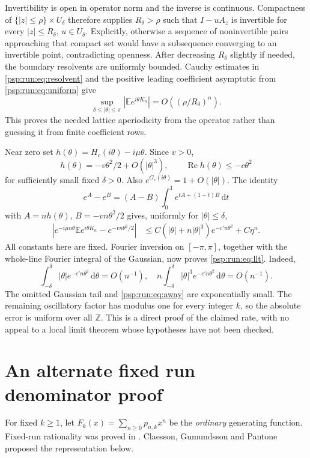\documentclass[11pt,letterpaper]{article}
\numberwithin{equation}{section}
\theoremstyle{remark}\newtheorem{remark}[theorem]{Remark}
\newcommand{\dd}{\,\mathrm d}
\newcommand{\EE}{\mathbb E}
\begin{document}
Invertibility is open in operator norm and the inverse is continuous.
Compactness of $\{|z|\leq\rho\}\times U_\delta$ therefore supplies
$R_\delta>\rho$ such that $I-uA_z$ is invertible for every
$|z|\leq R_\delta$, $u\in U_\delta$. Explicitly, otherwise a sequence
of noninvertible pairs approaching that compact set would have a
subsequence converging to an invertible point, contradicting openness.
After decreasing $R_\delta$ slightly if needed, the boundary resolvents
are uniformly bounded. Cauchy estimates in \eqref{psp:run:eq:resolvent} and the
positive leading coefficient asymptotic from \eqref{psp:run:eq:uniform} give
\begin{equation}\label{psp:run:eq:away}
 \sup_{\delta\leq|\theta|\leq\pi}
 |\EE e^{i\theta K_n}|=O((\rho/R_\delta)^n).
\end{equation}
This proves the needed lattice aperiodicity from the operator rather
than guessing it from finite coefficient rows.

Near zero set $h(\theta)=H_c(i\theta)-i\mu\theta$. Since $v>0$,
\[
 h(\theta)=-v\theta^2/2+O(|\theta|^3),\qquad
 \operatorname{Re}h(\theta)\leq-c\theta^2
\]
for sufficiently small fixed $\delta>0$. Also
$e^{G_c(i\theta)}=1+O(|\theta|)$. The identity
\[
 e^A-e^B=(A-B)\int_0^1e^{tA+(1-t)B}\dd t
\]
with $A=nh(\theta)$, $B=-vn\theta^2/2$ gives, uniformly for
$|\theta|\leq\delta$,
\begin{align}
 \left|e^{-i\mu n\theta}\EE e^{i\theta K_n}
                    -e^{-vn\theta^2/2}\right|
 &\leq C(|\theta|+n|\theta|^3)e^{-c'n\theta^2}+C\eta^n.
 \label{psp:run:eq:near}
\end{align}
All constants here are fixed. Fourier inversion on $[-\pi,\pi]$,
together with the whole-line Fourier integral of the Gaussian, now
proves \eqref{psp:run:eq:llt}. Indeed,
\[
 \int_{-\delta}^{\delta}|\theta|e^{-c'n\theta^2}\dd\theta=O(n^{-1}),
 \quad
 n\int_{-\delta}^{\delta}|\theta|^3e^{-c'n\theta^2}\dd\theta=O(n^{-1}).
\]
The omitted Gaussian tail and \eqref{psp:run:eq:away} are exponentially small.
The remaining oscillatory factor has modulus one for every integer
$k$, so the absolute error is uniform over all $\mathbb Z$.
This is a direct proof of the claimed rate, with no appeal to a local
limit theorem whose hypotheses have not been checked.

\section{An alternate fixed run denominator proof}\label{psp:run:sec:fixed}
For fixed $k\geq1$, let $F_k(x)=\sum_{n\geq0}p_{n,k}x^n$ be the
\emph{ordinary} generating function. Fixed-run rationality was proved
in \cite[Theorem 6]{abh}. Claesson, Gu\dh mundsson and Pantone
\cite[Conjecture 2]{cgp} proposed the representation below.
\end{document}
